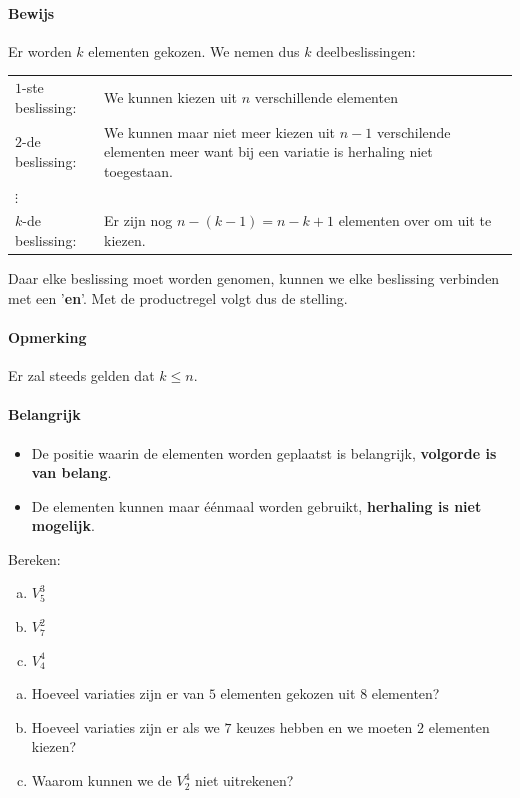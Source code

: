\documentclass[12pt,a4paper,twoside]{article}
\begin{document}
\paragraph*{Bewijs}
Er worden $k$ elementen gekozen. We nemen dus $k$ deelbeslissingen:
\begin{center}
\begin{tabular}{lp{12cm}}
$1$-ste beslissing: & We kunnen kiezen uit $n$ verschillende elementen\\
$2$-de beslissing: & We kunnen maar niet meer kiezen uit $n-1$ verschilende elementen meer want bij een variatie is herhaling niet toegestaan.\\
$\vdots$ & \\
$k$-de beslissing: & Er zijn nog $n-(k-1)=n-k+1$ elementen over om uit te kiezen.
\end{tabular}
\end{center}
Daar elke beslissing moet worden genomen, kunnen we elke beslissing verbinden met een '{\bf en}'. Met de productregel volgt dus de stelling.


\paragraph*{Opmerking} Er zal steeds gelden dat $k\leq n$.

\paragraph*{Belangrijk}
\begin{itemize}
  \item De positie waarin de elementen worden geplaatst is belangrijk, {\bf volgorde is van belang}.
  \item De elementen kunnen maar éénmaal worden gebruikt, {\bf herhaling is niet mogelijk}.
\end{itemize}

\begin{oefening}
Bereken:
\begin{multicols}{3}
\begin{enumerate}[(a)]
  \item $V^3_5$
  \item $V^2_7$
  \item $V^4_4$
\end{enumerate}
\end{multicols}
\end{oefening}

\begin{oefening}
\begin{enumerate}[(a)]
  \item Hoeveel variaties zijn er van $5$ elementen gekozen uit $8$ elementen?
  \item Hoeveel variaties zijn er als we $7$ keuzes hebben en we moeten $2$ elementen kiezen?
  \item Waarom kunnen we de $V^4_2$ niet uitrekenen?
  \end{enumerate}
\end{oefening}
\end{document}
